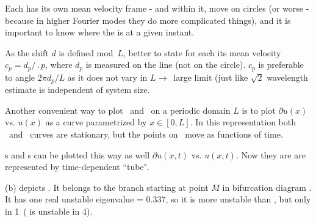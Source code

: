 
Each {\rpo} has its own mean velocity frame - and within it, {\eqv}
move on circles (or worse - because in higher Fourier modes they do more
complicated things), and it is important to know where the {\eqv} is at
a given instant.

As the shift $d$ is defined mod~$L$, better to
state for each {\rpo} its mean velocity $c_p = d_p/\period{p}$,
where $d_p$ is measured on the line (not on the circle). $c_p$ is
preferable to angle $2\pi d_p/L$ as it does not vary in $L \to$~large
limit (just like $\sqrt{2}$ wavelength estimate is independent of
system size.

Another convenient way to plot \eqva\ and \reqva\ on a periodic
domain $L$ is to plot
$\partial u(x)$ vs. $u(x)$ as a curve parametrized by
$x\in [0,L]$. In this representation both \eqva\ and \reqva\ curves are
stationary, but the points on \reqva\ move as functions of time.

\Po s and \rpo s can be plotted this way as well
$\partial u(x,t)$ vs. $u(x,t)$. Now they are are represented by time-dependent
``tube".

(b)
depicts .
It belongs to the branch starting at point $M$
in bifurcation diagram .
It has one real unstable eigenvalue = 0.337,
so it is more unstable than ,
but only in 1\dmn\ ( is unstable in 4\dmn).
